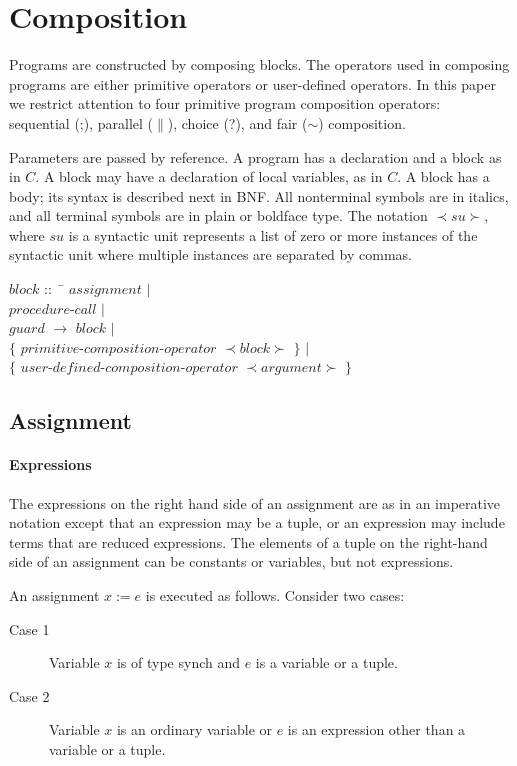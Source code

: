\section{Composition}
Programs are constructed by composing blocks.
The operators used in composing programs are either primitive operators
or user-defined operators.
In this paper we restrict attention to four primitive program composition 
operators:\\
sequential (;), 
parallel ($\|$), 
choice (?), and 
fair ($\sim$) composition.


Parameters are passed by reference.
A program has a declaration and a block as in $C$.
A block may have a declaration of local variables, as in $C$.
A block has a body; its syntax is described next
in BNF.
All nonterminal symbols are in italics, and all terminal symbols are in
plain or boldface type.
The notation $\prec su \succ$, where $su$ is a syntactic unit represents
a list of zero or more instances of the syntactic unit
where multiple instances are separated by commas.

\begin{tabbing}
$block$ ::$\; \;$ \= $assignment$ $|$ \\
          \> $procedure$-$call$ $|$ \\
          \> $guard$ $\rightarrow$ $block$ $|$ \\
        \> $\{$ $primitive$-$composition$-$operator$ 
                $\prec block \succ$ $\}$  $|$\\
        \> $\{$ $user$-$defined$-$composition$-$operator$ 
             $\prec argument \succ$ $\}$ \\
\end{tabbing}
\subsection{Assignment}
\paragraph{Expressions}
The expressions on the right hand side of an assignment are as in an imperative
notation except that an expression may be a tuple, or an
expression may include terms that are reduced expressions.
The elements of a tuple on the right-hand side of an assignment 
can be constants or variables, but not expressions.

An assignment $x := e$ is executed as follows. Consider two cases: 
\begin{description}
    \item[Case 1] Variable $x$ is of type synch 
          and $e$ is a variable or a tuple.
    \item[Case 2] Variable $x$ is an ordinary variable or $e$ is an
         expression other than a variable or a tuple.
\end{description} 
